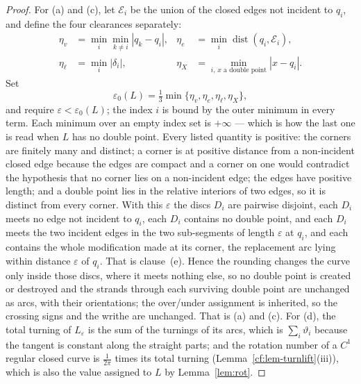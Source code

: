 \begin{proof}
For (a) and (c), let $\mathcal E_i$ be the union of the closed edges
not incident to $q_i$, and define the four clearances separately:
\[
\begin{aligned}
 \eta_v&=\min_i\min_{k\ne i}|q_k-q_i|,
 &\eta_e&=\min_i\operatorname{dist}(q_i,\mathcal E_i),\\
 \eta_\ell&=\min_i|\delta_i|,
 &\eta_X&=\min_{i,\,x\text{ a double point}}|x-q_i|.
\end{aligned}
\]
Set
\[
 \varepsilon_0(L)=\tfrac13\min\{\eta_v,\eta_e,\eta_\ell,\eta_X\},
\]
and require $\varepsilon<\varepsilon_0(L)$; the index $i$ is bound by the outer
minimum in every term.
Each minimum over an empty index set is $+\infty$ --- which is how the last
one is read when $L$ has no double point. Every listed quantity is positive: the
corners are finitely many and distinct; a corner is at positive distance from a
non-incident closed edge because the edges are compact and a corner on one would
contradict the hypothesis that no corner lies on a non-incident edge; the edges have positive length; and a double point lies
in the relative interiors of two edges, so it is distinct from every corner.
With this $\varepsilon$ the discs $D_i$ are pairwise disjoint, each $D_i$ meets
no edge not incident to $q_i$, each $D_i$ contains no double point, and each
$D_i$ meets the two incident edges in the two sub-segments of length
$\varepsilon$ at $q_i$, and each contains the whole modification made at its
corner, the replacement arc lying within distance $\varepsilon$ of $q_i$. That
is clause~(e). Hence the rounding changes the curve only inside those
discs, where it meets nothing else, so no double point is created or destroyed
and the strands through each surviving double point are unchanged as arcs, with
their orientations; the over/under assignment is inherited, so the crossing signs
and the writhe are unchanged. That is (a) and (c). For (d), the total turning of
$L_\varepsilon$ is the sum of the turnings of its arcs, which is
$\sum_i\vartheta_i$ because the tangent is constant along the straight parts; and the
rotation number of a $C^1$ regular closed curve is $\frac1{2\pi}$ times its
total turning (Lemma~\ref{cf:lem-turnlift}(iii)), which is also the value assigned to $L$
by Lemma~\ref{lem:rot}.
\end{proof}


